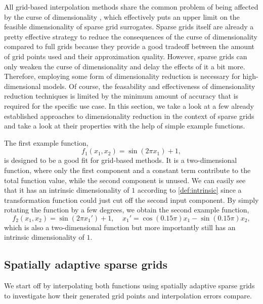 \documentclass[
  a4paper,  %
  twoside,  %
  bibliography=totoc,
  headsepline,
  cleardoublepage=empty,
  parskip=half,
  draft=false
]{scrbook}
\begin{document}
All grid-based interpolation methods share the common problem of being affected by the curse of dimensionality \cite{Bellman1961}, which effectively puts an upper limit on the feasible dimensionality of sparse grid surrogates.
Sparse grids itself are already a pretty effective strategy to reduce the consequences of the curse of dimensionality compared to full grids because they provide a good tradeoff between the amount of grid points used and their approximation quality.
However, sparse grids can only weaken the curse of dimensionality and delay the effects of it a bit more.
Therefore, employing some form of dimensionality reduction is necessary for high-dimensional models.
Of course, the feasability and effectiveness of dimensionality reduction techniques is limited by the minimum amount of accuracy that is required for the specific use case.
In this section, we take a look at a few already established approaches to dimensionality reduction in the context of sparse grids and take a look at their properties with the help of simple example functions.

The first example function,
\begin{equation}
f_1(x_1, x_2)=\sin(2 \pi x_1) + 1,
\end{equation}
is designed to be a good fit for grid-based methods.
It is a two-dimensional function, where only the first component and a constant term contribute to the total function value, while the second component is unused.
We can easily see that it has an intrinsic dimensionality of $1$ according to \cref{def:intrinsic} since a transformation function could just cut off the second input component.
By simply rotating the function by a few degrees, we obtain the second example function,
\begin{equation}
f_2(x_1,x_2)=\sin(2 \pi x_1') + 1, ~~~~~ x_1'=\cos(0.15 \pi) x_1 -\sin(0.15 \pi) x_2,
\end{equation}
which is also a two-dimensional function but more importantly still has an intrinsic dimensionality of $1$.

\subsection{Spatially adaptive sparse grids}

We start off by interpolating both functions using spatially adaptive sparse grids to investigate how their generated grid points and interpolation errors compare.
\end{document}
